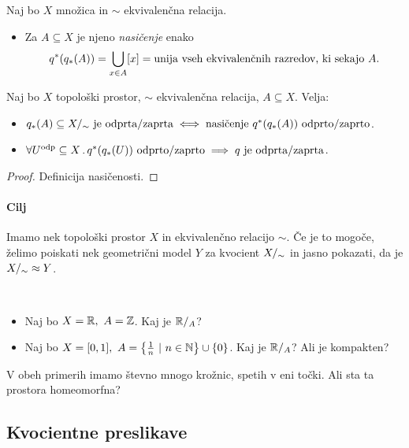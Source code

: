 \newpage
\begin{definicija}
    Naj bo \(X\) množica in \(\sim\) ekvivalenčna relacija. 
    \begin{itemize}
        \item Za \(A \subseteq X\) je njeno \emph{nasičenje} enako \[\invimg{q}(\img{q}(A)) = \bigcup_{x \in A} [x] = \text{unija vseh ekvivalenčnih razredov, ki sekajo} \ A.\]
    \end{itemize}
\end{definicija}

\begin{trditev}
    Naj bo \(X\) topološki prostor, \(\sim\) ekvivalenčna relacija, \(A \subseteq X\). Velja:
    \begin{itemize}
        \item \(\img{q}(A) \subseteq \qs{X} \ \text{je odprta/zaprta} \liff  \text{nasičenje} \ \invimg{q}(\img{q}(A)) \ \text{odprto/zaprto}\). 
        \item \(\forall U^{\text{odp}} \subseteq X \,.\, q^{*}(q_{*}(U)) \ \text{odprto/zaprto} \implies q \ \text{je odprta/zaprta}\).
    \end{itemize}
\end{trditev}

\begin{proof}
    Definicija nasičenosti.
\end{proof}

\paragraph{Cilj} Imamo nek topološki prostor \(X\) in ekvivalenčno relacijo \(\sim\). Če je to mogoče, želimo poiskati nek geometrični model \(Y\) za kvocient \({X/_\sim}\) in jasno pokazati, da je \({X/_\sim} \approx Y\).

\begin{primer}
    \
    \begin{itemize}
        \item Naj bo \(X = \mathbb{R}, \ A = \mathbb{Z}\). Kaj je \(\mathbb{R}/_{A}\)?
        \item Naj bo \(X = [0,1], \ A = \left\{\frac{1}{n} \ | \ n \in \mathbb{N}\right\} \cup \left\{0\right\}\). Kaj je \(\mathbb{R}/_{A}\)? Ali je kompakten?
    \end{itemize}
    V obeh primerih imamo števno mnogo krožnic, spetih v eni točki. Ali sta ta prostora homeomorfna?
\end{primer}

\subsection{Kvocientne preslikave}
